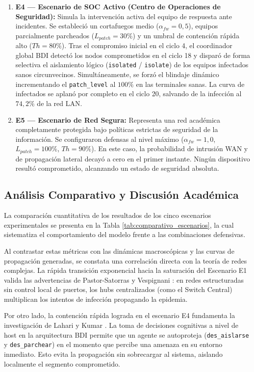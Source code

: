 \begin{enumerate}
    \item \textbf{E4 — Escenario de SOC Activo (Centro de Operaciones de Seguridad):} Simula la intervención activa del equipo de respuesta ante incidentes. Se estableció un cortafuegos medio ($\alpha_{fw} = 0,5$), equipos parcialmente parcheados ($L_{patch} = 30\%$) y un umbral de contención rápida alto ($Th = 80\%$). Tras el compromiso inicial en el ciclo 4, el coordinador global BDI detectó los nodos comprometidos en el ciclo 18 y disparó de forma selectiva el aislamiento lógico (\texttt{isolated} / \texttt{isolate}) de los equipos infectados sanos circunvecinos. Simultáneamente, se forzó el blindaje dinámico incrementando el \texttt{patch\_level} al $100\%$ en las terminales sanas. La curva de infectados se aplanó por completo en el ciclo 20, salvando de la infección al $74,2\%$ de la red LAN.
    \item \textbf{E5 — Escenario de Red Segura:} Representa una red académica completamente protegida bajo políticas estrictas de seguridad de la información. Se configuraron defensas al nivel máximo ($\alpha_{fw} = 1,0$, $L_{patch} = 100\%$, $Th = 90\%$). En este caso, la probabilidad de intrusión WAN y de propagación lateral decayó a cero en el primer instante. Ningún dispositivo resultó comprometido, alcanzando un estado de seguridad absoluta.
\end{enumerate}

\subsection{Análisis Comparativo y Discusión Académica}
La comparación cuantitativa de los resultados de los cinco escenarios experimentales se presenta en la Tabla \ref{tab:comparativo_escenarios}, la cual sistematiza el comportamiento del modelo frente a las combinaciones defensivas.

Al contrastar estas métricas con las dinámicas macroscópicas y las curvas de propagación generadas, se constata una correlación directa con la teoría de redes complejas. La rápida transición exponencial hacia la saturación del Escenario E1 valida las advertencias de Pastor-Satorras y Vespignani \cite{pastorsatorras2001epidemic}: en redes estructuradas sin control local de puertos, los hubs centralizados (como el Switch Central) multiplican los intentos de infección propagando la epidemia. 

Por otro lado, la contención rápida lograda en el escenario E4 fundamenta la investigación de Lahari y Kumar \cite{lahari2025optimal}. La toma de decisiones cognitivas a nivel de host en la arquitectura BDI permite que un agente se autoproteja (\texttt{des\_aislarse} y \texttt{des\_parchear}) en el momento que percibe una amenaza en su entorno inmediato. Esto evita la propagación sin sobrecargar al sistema, aislando localmente el segmento comprometido. 

